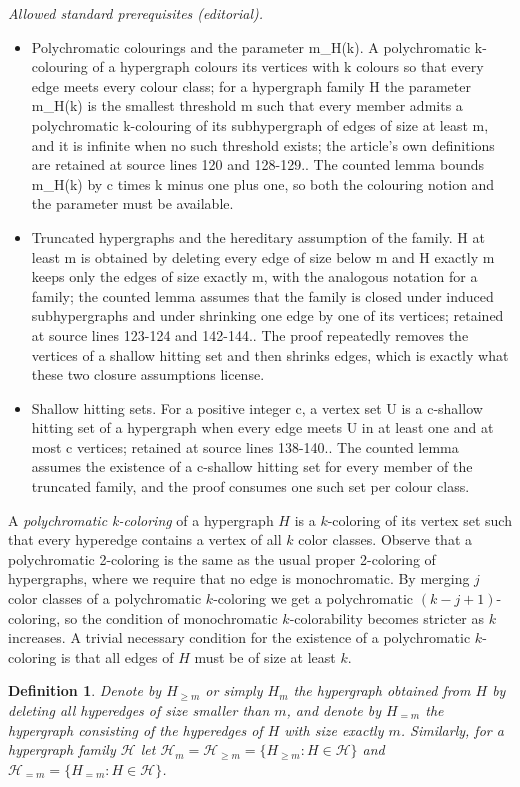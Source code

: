 \documentclass[11pt,oneside]{amsart}
\newcommand{\HH}{\mathcal{H}}
\newtheorem{definition}{Definition}
\begin{document}
\noindent\textit{Allowed standard prerequisites (editorial).}\begin{itemize}
\item Polychromatic colourings and the parameter m\_H(k). A polychromatic k-colouring of a hypergraph colours its vertices with k colours so that every edge meets every colour class; for a hypergraph family H the parameter m\_H(k) is the smallest threshold m such that every member admits a polychromatic k-colouring of its subhypergraph of edges of size at least m, and it is infinite when no such threshold exists; the article's own definitions are retained at source lines 120 and 128-129.. The counted lemma bounds m\_H(k) by c times k minus one plus one, so both the colouring notion and the parameter must be available.
\item Truncated hypergraphs and the hereditary assumption of the family. H at least m is obtained by deleting every edge of size below m and H exactly m keeps only the edges of size exactly m, with the analogous notation for a family; the counted lemma assumes that the family is closed under induced subhypergraphs and under shrinking one edge by one of its vertices; retained at source lines 123-124 and 142-144.. The proof repeatedly removes the vertices of a shallow hitting set and then shrinks edges, which is exactly what these two closure assumptions license.
\item Shallow hitting sets. For a positive integer c, a vertex set U is a c-shallow hitting set of a hypergraph when every edge meets U in at least one and at most c vertices; retained at source lines 138-140.. The counted lemma assumes the existence of a c-shallow hitting set for every member of the truncated family, and the proof consumes one such set per colour class.
\end{itemize}\medskip
A {\it polychromatic k-coloring} of a hypergraph $H$ is a $k$-coloring of its vertex set such that every hyperedge contains a vertex of all $k$ color classes. Observe that a polychromatic 2-coloring is the same as the usual proper 2-coloring of hypergraphs, where we require that no edge is monochromatic. By merging $j$ color classes of a polychromatic $k$-coloring we get a polychromatic $(k-j+1)$-coloring, so the condition of monochromatic $k$-colorability becomes stricter as $k$ increases. A trivial necessary condition for the existence of a polychromatic $k$-coloring is that all edges of $H$ must be of size at least $k$.

\begin{definition} Denote by $H_{\ge m}$ or simply $H_m$ the hypergraph obtained from $H$ by deleting all hyperedges of size smaller than $m$, and denote by $H_{=m}$ the hypergraph consisting of the hyperedges of $H$ with size exactly $m$. Similarly, for a hypergraph family $\mathcal{H}$ let $\HH_m=\HH_{\ge m}=\{H_{\ge m}:H\in\HH\}$ and $\HH_{=m}=\{H_{=m}:H\in\HH\}$.
\end{definition}
\end{document}
